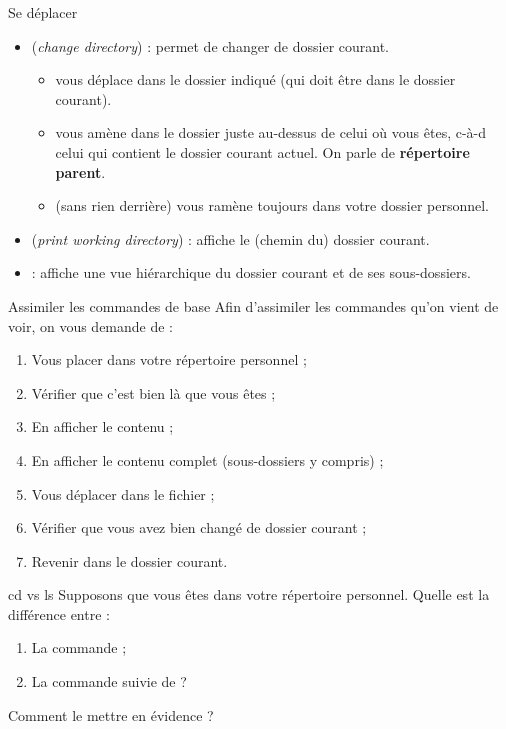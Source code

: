 \documentclass[a4paper,11pt]{style-esi/td}
\begin{document}
		\bigskip
		\begin{theorie}{Se déplacer}
			\begin{itemize}
			\item {} (\emph{change directory}) : permet de changer de dossier courant.
				\begin{itemize}
				\item {}
					vous déplace dans le dossier indiqué (qui doit être dans le dossier courant).
				\item {}
					vous amène dans le dossier juste au-dessus de celui où vous êtes, 
					c-à-d celui qui contient le dossier courant actuel.
					On parle de \textbf{répertoire parent}.
				\item {}
					(sans rien derrière) vous ramène toujours dans votre dossier personnel.
				\end{itemize}
			\item {} (\textit{print working directory})  :
				affiche le (chemin du) dossier courant.
			\item {} :
				affiche une vue hiérarchique du dossier courant et de ses sous-dossiers.
			\end{itemize}
		\end{theorie}

		\begin{Exercice}{Assimiler les commandes de base}
			Afin d'assimiler les commandes qu'on vient de voir,
			on vous demande de :
			\begin{enumerate}
				\item Vous placer dans votre répertoire personnel ;
				\item Vérifier que c'est bien là que vous êtes ;
				\item En afficher le contenu ;
				\item En afficher le contenu complet (sous-dossiers y compris) ;
				\item Vous déplacer dans le fichier  ;
				\item Vérifier que vous avez bien changé de dossier courant ;
				\item Revenir dans le dossier courant.
			\end{enumerate}
		\end{Exercice}

		\begin{Exercice}{cd vs ls}
			Supposons que vous êtes dans votre répertoire personnel.
			Quelle est la différence entre :
			\begin{enumerate}
				\item La commande  ;
				\item La commande  suivie de  ?
			\end{enumerate}
			Comment le mettre en évidence ?
		\end{Exercice}			
\end{document}
